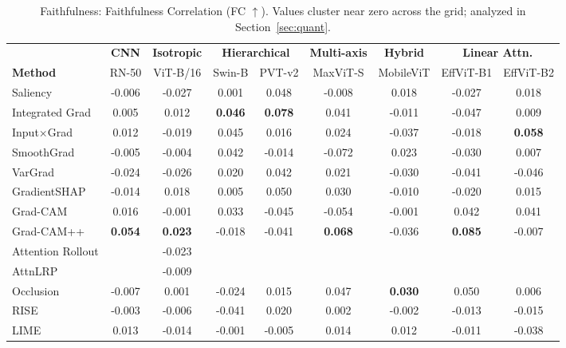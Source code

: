 \documentclass[final,5p,times,twocolumn]{elsarticle}
\newcommand{\best}[1]{\textbf{#1}}
\newcommand{\nd}{\textemdash}
\begin{document}
\begin{table}[t]
  \centering
  \caption{Faithfulness: Faithfulness Correlation (FC $\uparrow$). Values cluster near zero across the grid; analyzed in Section~\ref{sec:quant}.}
  \label{tab:fc}
  \setlength{\tabcolsep}{4pt}
  \begin{tabular}{l cc cc cc cc}
    \toprule
     & \multicolumn{1}{c}{\textbf{CNN}} & \multicolumn{1}{c}{\textbf{Isotropic}} & \multicolumn{2}{c}{\textbf{Hierarchical}} & \multicolumn{1}{c}{\textbf{Multi-axis}} & \multicolumn{1}{c}{\textbf{Hybrid}} & \multicolumn{2}{c}{\textbf{Linear Attn.}} \\
    \cmidrule(lr){2-2} \cmidrule(lr){3-3} \cmidrule(lr){4-5} \cmidrule(lr){6-6} \cmidrule(lr){7-7} \cmidrule(lr){8-9}
    \textbf{Method} & RN-50 & ViT-B/16 & Swin-B & PVT-v2 & MaxViT-S & MobileViT & EffViT-B1 & EffViT-B2 \\
    \midrule
    Saliency & -0.006 & -0.027 & 0.001 & 0.048 & -0.008 & 0.018 & -0.027 & 0.018 \\
    Integrated Grad & 0.005 & 0.012 & \best{0.046} & \best{0.078} & 0.041 & -0.011 & -0.047 & 0.009 \\
    Input$\times$Grad & 0.012 & -0.019 & 0.045 & 0.016 & 0.024 & -0.037 & -0.018 & \best{0.058} \\
    SmoothGrad & -0.005 & -0.004 & 0.042 & -0.014 & -0.072 & 0.023 & -0.030 & 0.007 \\
    VarGrad & -0.024 & -0.026 & 0.020 & 0.042 & 0.021 & -0.030 & -0.041 & -0.046 \\
   GradientSHAP & -0.014 & 0.018 & 0.005 & 0.050 & 0.030 & -0.010 & -0.020 & 0.015 \\
    \midrule
    Grad-CAM & 0.016 & -0.001 & 0.033 & -0.045 & -0.054 & -0.001 & 0.042 & 0.041 \\
    Grad-CAM++ & \best{0.054} & \best{0.023} & -0.018 & -0.041 & \best{0.068} & -0.036 & \best{0.085} & -0.007 \\
    \midrule
    Attention Rollout & \nd & -0.023 & \nd & \nd & \nd & \nd & \nd & \nd \\
    AttnLRP &\nd & -0.009 & \nd & \nd & \nd & \nd & \nd & \nd \\
    \midrule
    Occlusion & -0.007 & 0.001 & -0.024 & 0.015 & 0.047 & \best{0.030} & 0.050 & 0.006 \\
    RISE & -0.003 & -0.006 & -0.041 & 0.020 & 0.002 & -0.002 & -0.013 & -0.015 \\
    LIME & 0.013 & -0.014 & -0.001 & -0.005 & 0.014 & 0.012 & -0.011 & -0.038 \\
    \bottomrule
  \end{tabular}
\end{table}
\end{document}
